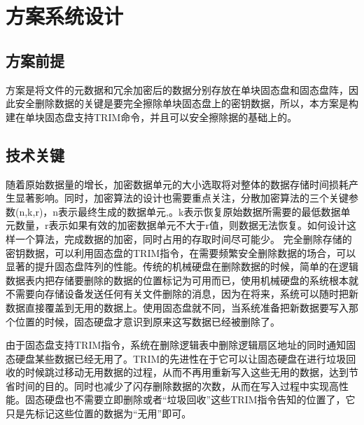 \chapter{方案系统设计}
\section{方案前提}
方案是将文件的元数据和冗余加密后的数据分别存放在单块固态盘和固态盘阵，因此安全删除数据的关键是要完全擦除单块固态盘上的密钥数据，所以，本方案是构建在单块固态盘支持TRIM命令，并且可以安全擦除据的基础上的。
\section{技术关键}
随着原始数据量的增长，加密数据单元的大小选取将对整体的数据存储时间损耗产生显著影响。同时，加密算法的设计也需要重点关注，分散加密算法的三个关键参数(n,k,r)，n表示最终生成的数据单元,。k表示恢复原始数据所需要的最低数据单元数量，r表示如果有效的加密数据单元不大于r值，则数据无法恢复。如何设计这样一个算法，完成数据的加密，同时占用的存取时间尽可能少。 
完全删除存储的密钥数据，可以利用固态盘的TRIM指令，在需要频繁安全删除数据的场合，可以显著的提升固态盘阵列的性能。传统的机械硬盘在删除数据的时候，简单的在逻辑数据表内把存储要删除的数据的位置标记为可用而已，使用机械硬盘的系统根本就不需要向存储设备发送任何有关文件删除的消息，因为在将来，系统可以随时把新数据直接覆盖到无用的数据上。使用固态盘就不同，当系统准备把新数据要写入那个位置的时候，固态硬盘才意识到原来这写数据已经被删除了。


由于固态盘支持TRIM指令，系统在删除逻辑表中删除逻辑扇区地址的同时通知固态硬盘某些数据已经无用了。TRIM的先进性在于它可以让固态硬盘在进行垃圾回收的时候跳过移动无用数据的过程，从而不再用重新写入这些无用的数据，达到节省时间的目的。同时也减少了闪存删除数据的次数，从而在写入过程中实现高性能。固态硬盘也不需要立即删除或者“垃圾回收”这些TRIM指令告知的位置了，它只是先标记这些位置的数据为“无用”即可。


